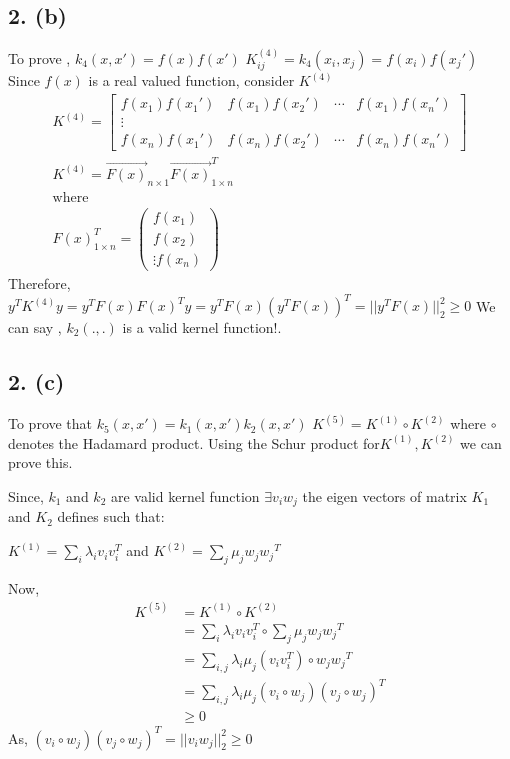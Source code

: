 \documentclass[10pt,letterpaper]{article}
\begin{document}
\subsection{2. (b) }
To prove , $k_4(x,x') =f(x)f(x')$ 
			 $K^{(4)}_{ij} = k_4(x_i,x_j) = f(x_i)f(x_j')$\\			
			Since $f(x)$ is a real valued function, consider $K^{(4)}$
			\begin{align*}
			K^{(4)} = \begin{bmatrix}
			f(x_1)f(x_1') & f(x_1)f(x_2') & \cdots & f(x_1)f(x_n')\\
			\vdots\\
			f(x_n)f(x_1') & f(x_n)f(x_2') & \cdots & f(x_n)f(x_n')
			\end{bmatrix}\\
			K^{(4)} = \vec{F({x})}_{n\times 1} \vec{F(x)}^T_{1 \times n} \\
			\text{where}\\
			F(x)^T_{1 \times n} = \begin{pmatrix}
			f(x_1)\\
			f(x_2)\\
			\vdots
			f(x_n)
			\end{pmatrix}
			\end{align*}			
			Therefore, $y^TK^{(4)}y = y^TF(x)F(x)^Ty = y^TF(x)(y^TF(x))^T = ||y^TF(x)||_2^2 \geq 0$			
			We can say , $k_2(.,.)$ is a valid kernel function!.
\subsection{2. (c) }
To prove that $k_5(x,x') = k_1(x,x')k_2(x,x')$			
			$K^{(5)} = K^{(1)} \circ K^{(2)}$ where $\circ$ denotes the Hadamard product. Using the Schur product for$K^{(1)} , K^{(2)}$ we can prove this.
			
			
			Since, $k_1$ and $k_2$ are valid kernel function $\exists v_i w_j$ the eigen vectors of matrix $K_1$ and $K_2$ defines such that:
			
			$K^{(1)} = \sum_{i} \lambda_i v_i v_i^T$ and $K^{(2)} = \sum_{j} \mu_j {w_j}{w_j}^T$
			
			Now,\begin{align*}
			K^{(5)} &=  K^{(1)} \circ K^{(2)}\\
			&=  \sum_{i} \lambda_i v_i v_i^T \circ \sum_{j} \mu_j {w_j}{w_j}^T\\
			&= \sum_{i,j} \lambda_i \mu_j  (v_i v_i^T) \circ {w_j}{w_j}^T\\
			&= 	\sum_{i,j} \lambda_i \mu_j  (v_i \circ w_j) ({v_j}\circ {w_j})^T\\
			&\geq 0
			\end{align*}
			As, $(v_i \circ w_j) ({v_j}\circ {w_j})^T  = ||v_i w_j||_2^2\geq 0$ 
			
\end{document}
